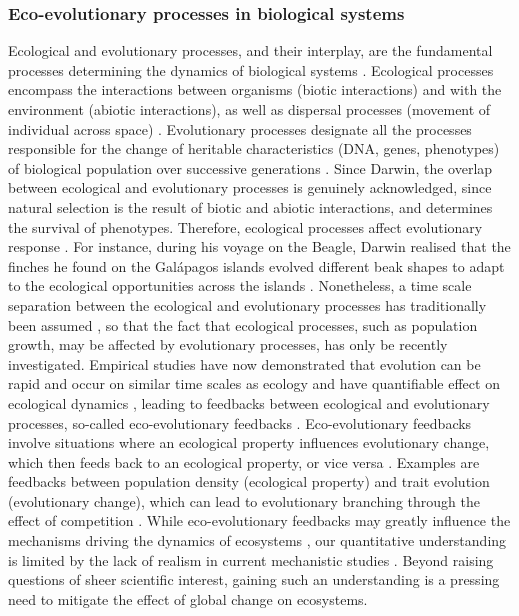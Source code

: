 \subsubsection*{Eco-evolutionary processes in biological systems}
% 
Ecological and evolutionary processes, and their interplay, are the fundamental processes determining the dynamics of biological systems \cite{Pelletier2009}.
% 
Ecological processes encompass the interactions between organisms (biotic interactions) and with the environment (abiotic interactions), as well as dispersal processes (movement of individual across space) \cite{Vellend2010a}.
% 
Evolutionary processes designate all the processes responsible for the change of heritable characteristics (DNA, genes, phenotypes) of biological population over successive generations \cite{Hall2013}.
% 
Since Darwin, the overlap between ecological and evolutionary processes is genuinely acknowledged, since natural selection is the result of biotic and abiotic interactions, and determines the survival of phenotypes. Therefore, ecological processes affect evolutionary response \cite{Ezard2009}.
% 
For instance, during his voyage on the Beagle, Darwin realised that the finches he found on the Galápagos islands evolved different beak shapes to adapt to the ecological opportunities across the islands \cite{darwin2004origin}.
% 
Nonetheless, a time scale separation between the ecological and evolutionary processes has traditionally been assumed \cite{slobodkin1980growth}, so that the fact that ecological processes, such as population growth, may be affected by evolutionary processes, has only be recently investigated. Empirical studies have now demonstrated that evolution can be rapid and occur on similar time scales as ecology \cite{Hairston2005, Pelletier2009} and have quantifiable effect on ecological dynamics \cite{Ezard2009}, leading to feedbacks between ecological and evolutionary processes, so-called eco-evolutionary feedbacks \cite{Pelletier2009,Schoener2011}. 
% 
Eco-evolutionary feedbacks involve situations where an ecological property influences evolutionary change, which then feeds back to an ecological property, or vice versa \cite{Govaert2019a}. Examples are feedbacks between population density (ecological property) and trait evolution (evolutionary change), which can lead to evolutionary branching through the effect of competition \cite{Doebeli1999}.
% 
% 
While eco-evolutionary feedbacks may greatly influence the mechanisms driving the dynamics of ecosystems \cite{Urban2016}, our quantitative understanding is limited by the lack of realism in current mechanistic studies \cite{Lion2022}. Beyond raising questions of sheer scientific interest, gaining such an understanding is a pressing need to mitigate the effect of global change on ecosystems.

